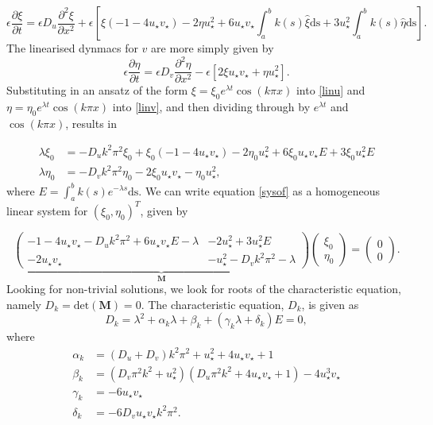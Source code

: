 \begin{equation}\label{linu}
  \epsilon \frac{\partial \xi}{\partial t}=\epsilon D_u\frac{\partial^2\xi}{\partial x^2}+\epsilon\left[\xi(-1-4u_\star v_\star)-2\eta u_\star^2 +6u_\star v_\star\int_a^bk(s)\hat{\xi}\text{ds}+3u_\star^2\int_a^bk(s)\hat{\eta}\text{ds}\right].
\end{equation}
The linearised dynmacs for $v$ are more simply given by
\begin{equation}\label{linv}
\epsilon \frac{\partial\eta}{\partial t}=\epsilon D_v\frac{\partial^2\eta}{\partial x^2}-\epsilon\left[2\xi u_\star v_\star+\eta u_\star^2\right].
\end{equation}
Substituting in an ansatz of the form $\xi=\xi_0e^{\lambda t}\cos(k\pi x)$ \cite{yigaffneyli} into \eqref{linu} and $\eta=\eta_0e^{\lambda t}\cos(k\pi x)$ into \eqref{linv}, and then dividing through by $e^{\lambda t}$ and $\cos(k\pi x)$, results in

\begin{equation}\label{sysof}
  \begin{split}
\lambda\xi_0&=-D_uk^2\pi^2\xi_0+\xi_0(-1-4u_\star v_\star)-2\eta_0u_\star^2+6\xi_0u_\star v_\star E+3\xi_0u_\star^2E \\
\lambda\eta_0&=-D_vk^2\pi^2\eta_0-2\xi_0u_\star v_\star-\eta_0u_\star^2,
\end{split}
\end{equation}
where $E=\int_a^bk(s)e^{-\lambda s}\text{ds}$. We can write equation \eqref{sysof} as a homogeneous linear system for $(\xi_0,\eta_0)^T$, given by

\begin{equation}
\underbrace{\begin{pmatrix}-1-4u_\star v_\star-D_uk^2\pi^2+6u_\star v_\star E-\lambda&-2u_\star^2+3u_\star^2E\\-2u_\star v_\star&-u_\star^2-D_vk^2\pi^2-\lambda \end{pmatrix}}_{\textbf{M}}\begin{pmatrix}\xi_0\\\eta_0\end{pmatrix}=\begin{pmatrix}0\\0\end{pmatrix}.
\end{equation}
Looking for non-trivial solutions, we look for roots of the characteristic equation, namely $D_k=\text{det}(\textbf{M})=0$. The characteristic equation, $D_k$, is given as
\begin{equation}\label{characdist}
  D_k=\lambda^2+\alpha_k\lambda+\beta_k+(\gamma_k\lambda+\delta_k)E=0,
\end{equation}
where
\begin{align}
\alpha_k&=(D_u+D_v)k^2\pi^2+u_\star^2+4u_\star v_\star+1\\
\beta_k&=(D_v\pi^2k^2+u_\star^2)(D_u\pi^2k^2+4u_\star v_\star+1)-4u_\star^3v_\star\\
\gamma_k&=-6u_\star v_\star\\
\delta_k&=-6D_vu_\star v_\star k^2\pi^2.
\end{align}

